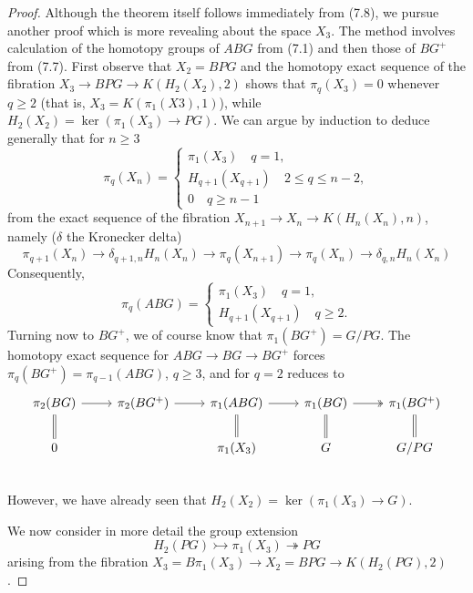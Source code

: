 \documentclass[openany,leqno]{book}  %
\begin{document}
\begin{proof}
Although the theorem itself follows immediately from (7.8), we pursue another proof which is more revealing about the space $X_3$. The method involves calculation of the homotopy groups of $ABG$ from (7.1) and then those of $ BG^+$ from (7.7). First observe that $X_2 = BPG$ and the homotopy exact sequence of the fibration $X_3 \longrightarrow BPG \longrightarrow K(H_2(X_2),2)$ shows that $\pi_q(X_3) = 0$ whenever $q \geqslant 2$ (that is, $X_3 = K(\pi_1 (X3), 1)$), while $H_2(X_2) = \ker (\pi_1(X_3)\longrightarrow PG)$. We can argue by induction to deduce generally that for $n \geqslant 3$
\begin{equation*}
\pi_q(X_n)=
  \begin{cases}
\pi_1(X_3) \quad q=1, \\
H_{q+1}(X_{q+1}) \quad 2\leqslant q\leqslant n-2,\\
0 \quad q\geqslant n-1
\end{cases}
\end{equation*}
from the exact sequence of the fibration $X_{n+1}\longrightarrow X_n \longrightarrow K(H_n(X_n), n)$, namely ($\delta$ the Kronecker delta)
\[\pi_{q+1}(X_{n})   \longrightarrow   \delta_{q+1,n}H_n(X_n)   \longrightarrow  \pi_{q}(X_{n+1})  \longrightarrow   \pi_{q}(X_{n})  \longrightarrow  \delta_{q,n}H_n(X_n)  \]
Consequently,
\begin{equation*}
\pi_q(ABG)=
  \begin{cases}
\pi_1(X_3) \quad q=1, \\
H_{q+1}(X_{q+1}) \quad q\geqslant 2.
\end{cases}
\end{equation*}
Turning now to $BG^+$, we of course know that $\pi_1(BG^+) = G/PG$. The homotopy exact sequence for $ABG \longrightarrow BG \longrightarrow BG^+$ forces $\pi_q(BG^+)=\pi_{q-1}(ABG)$, $q \geqslant 3$, and for $q= 2$ reduces to
\[
\begin{tikzcd}
  \pi_2(BG) \arrow[r] \arrow[equal]{d} &  \pi_2(BG^+) \arrow[r] &   \pi_1(ABG)  \arrow[r]\arrow[equal]{d}  & \pi_1(BG)\arrow[r,two heads] \arrow[equal]{d} &  \pi_1(BG^+) \arrow[equal]{d} \\
  0 & & \pi_1(X_3) & G & G/PG \\
\end{tikzcd}
\]
However, we have already seen that $H_2(X_2) = \ker (\pi_1(X_3) \longrightarrow G)$.

We now consider in more detail the group extension
\[H_2(PG)\rightarrowtail \pi_1(X_3) \twoheadrightarrow PG\]
arising from the fibration $X_3 = B\pi_1(X_3) \longrightarrow X_2 = BPG \longrightarrow  K(H_2(PG), 2)$.
\end{proof}
\end{document}
